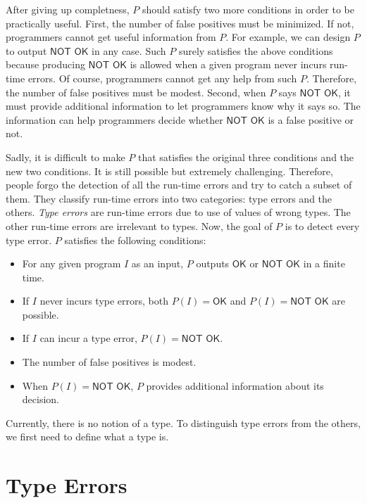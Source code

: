After giving up completness, $P$ should satisfy two more conditions in order to
be practically useful. First, the number of false positives must be minimized. If not,
programmers cannot get useful information from $P$. For example, we can design
$P$ to output $\textsf{NOT OK}$ in any case. Such $P$ surely satisfies the above
conditions because producing $\textsf{NOT OK}$ is allowed when a given program
never incurs run-time errors. Of course, programmers cannot get any help from
such $P$. Therefore, the number of false positives must be modest. Second, when
$P$ says $\textsf{NOT OK}$, it must provide additional information to let
programmers know why it says so. The information can help programmers decide
whether $\textsf{NOT OK}$ is a false positive or not.

Sadly, it is difficult to make $P$ that satisfies the original three conditions
and the new two conditions. It is still possible but extremely challenging.
Therefore, people forgo the detection of all the run-time errors and try to
catch a subset of them. They
classify run-time errors into two categories: type errors and the
others. \textit{Type errors} are run-time errors due to use of
values of wrong types. The other run-time errors are irrelevant to types.
Now, the goal of $P$ is to detect every type error. $P$ satisfies the following
conditions:
\begin{itemize}
  \item For any given program $I$ as an input, $P$ outputs $\textsf{OK}$ or
    $\textsf{NOT OK}$ in a finite time.
  \item If $I$ never incurs type errors,
    both $P(I)=\textsf{OK}$ and $P(I)=\textsf{NOT OK}$ are possible.
  \item If $I$ can incur a type error, $P(I)=\textsf{NOT OK}$.
  \item The number of false positives is modest.
  \item When $P(I)=\textsf{NOT OK}$, $P$ provides additional information about
    its decision.
\end{itemize}
Currently, there is no notion of a type. To distinguish type errors from the
others, we first need to define what a type is.

\section{Type Errors}

